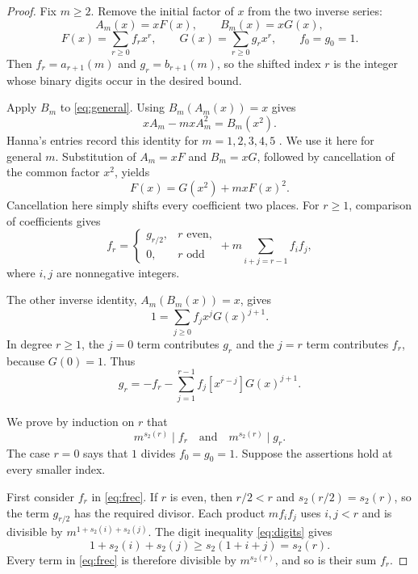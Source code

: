 \documentclass[11pt,a4paper]{article}
\theoremstyle{remark}
\begin{document}
\begin{proof}
Fix $m\ge2$. Remove the initial factor of $x$ from the two inverse series:
\[
 A_m(x)=xF(x),\qquad B_m(x)=xG(x),
\]
\[
 F(x)=\sum_{r\ge0}f_rx^r,\qquad
 G(x)=\sum_{r\ge0}g_rx^r,\qquad f_0=g_0=1.
\]
Then $f_r=a_{r+1}(m)$ and $g_r=b_{r+1}(m)$, so the shifted index $r$
is the integer whose binary digits occur in the desired bound.

Apply $B_m$ to \eqref{eq:general}. Using $B_m(A_m(x))=x$ gives
\[
 xA_m-mxA_m^2=B_m(x^2).
\]
Hanna's entries record this identity for $m=1,2,3,4,5$
\cite{oeis1,oeis2,oeis3,oeis4,oeis5}. We use it here for general $m$.
Substitution of $A_m=xF$ and $B_m=xG$, followed by cancellation of the
common factor $x^2$, yields
\begin{equation}\label{eq:FG}
 F(x)=G(x^2)+mxF(x)^2.
\end{equation}
Cancellation here simply shifts every coefficient two places. For $r\ge1$,
comparison of coefficients gives
\begin{equation}\label{eq:frec}
 f_r=\begin{cases}g_{r/2},&r\text{ even},\\0,&r\text{ odd}\end{cases}
       +m\sum_{i+j=r-1}f_if_j,
\end{equation}
where $i,j$ are nonnegative integers.

The other inverse identity, $A_m(B_m(x))=x$, gives
\[
 1=\sum_{j\ge0}f_jx^jG(x)^{j+1}.
\]
In degree $r\ge1$, the $j=0$ term contributes $g_r$ and the $j=r$
term contributes $f_r$, because $G(0)=1$. Thus
\begin{equation}\label{eq:grec}
 g_r=-f_r-\sum_{j=1}^{r-1}f_j[x^{r-j}]G(x)^{j+1}.
\end{equation}

We prove by induction on $r$ that
\begin{equation}\label{eq:simultaneous}
 m^{s_2(r)}\mid f_r\quad\text{and}\quad m^{s_2(r)}\mid g_r.
\end{equation}
The case $r=0$ says that $1$ divides $f_0=g_0=1$.
Suppose the assertions hold at every smaller index.

First consider $f_r$ in \eqref{eq:frec}. If $r$ is even, then
$r/2<r$ and $s_2(r/2)=s_2(r)$, so the term $g_{r/2}$ has the required
divisor. Each product $mf_if_j$ uses $i,j<r$ and is divisible by
$m^{1+s_2(i)+s_2(j)}$. The digit inequality \eqref{eq:digits} gives
\[
 1+s_2(i)+s_2(j)\ge s_2(1+i+j)=s_2(r).
\]
Every term in \eqref{eq:frec} is therefore divisible by $m^{s_2(r)}$,
and so is their sum $f_r$.


\end{proof}
\end{document}

